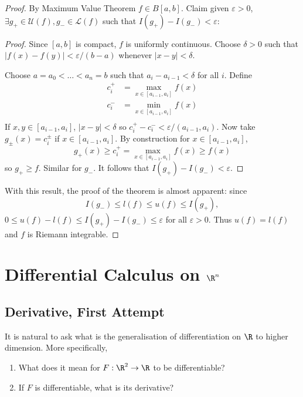 \documentclass[a4paper]{article}
\newcommand*{\riem}[1]{\mathcal{#1}}
\theoremstyle{definition}
\begin{document}
\begin{proof}
  By Maximum Value Theorem \(f \in B[a, b]\). Claim given \(\varepsilon > 0\), \(\exists g_+ \in \riem U(f), g_- \in \riem L(f)\) such that \(I(g_+) - I(g_-) < \varepsilon\):
  \begin{proof}
    Since \([a, b]\) is compact, \(f\) is uniformly continuous. Choose \(\delta > 0 \) such that \(|f(x) - f(y)| < \varepsilon/(b-a)\) whenever \(|x - y| < \delta\).
    
    Choose \(a = a_0 < \dots < a_n = b\) such that \(a_i - a_{i-1} < \delta\) for all \(i\). Define
    \begin{align*}
      c_i^+ &= \max_{x \in [a_{i-1}, a_i]} f(x) \\
      c_i^- &= \min_{x \in [a_{i-1}, a_i]} f(x) \\
    \end{align*}
    If \(x, y \in [a_{i-1}, a_i]\), \(|x - y| < \delta\) so \(c_i^+ - c_i^- < \varepsilon/(a_{i-1}, a_i)\). Now take \(g_\pm(x) = c_i^\pm\) if \(x \in [a_{i-1}, a_i]\). By construction for \(x \in [a_{i-1}, a_i]\),
    \[
      g_+(x) \geq c_i^+ = \max_{x \in [a_{i-1}, a_i]}f(x) \geq f(x)
    \]
    so \(g_+ \geq f\). Similar for \(g_-\). It follows that \(I(g_+) - I(g_-) < \varepsilon\).
  \end{proof}

  With this result, the proof of the theorem is almost apparent: since
  \[
    I(g_-) \leq l(f) \leq u(f) \leq I(g_+),
  \]
  \(0 \leq u(f) - l(f) \leq I(g_+) - I(g_-) \leq \varepsilon\) for all \(\varepsilon > 0\). Thus \(u(f) = l(f)\) and \(f\) is Riemann integrable.
\end{proof}

\section{Differential Calculus on \texorpdfstring{\(\R^n\)}{R\^{}n}}

\subsection{Derivative, First Attempt}

It is natural to ask what is the generalisation of differentiation on \(\R\) to higher dimension. More specifically,

\begin{question}\leavevmode
  \begin{enumerate}
  \item What does it mean for \(F: \R^2 \to \R\) to be differentiable?
  \item If \(F\) is differentiable, what is its derivative?
  \end{enumerate}
\end{question}
\end{document}
